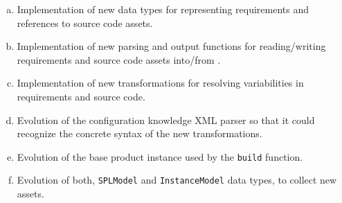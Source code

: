 \begin{enumerate}[(a)]

\item Implementation of new data types for representing requirements
  and references to source code assets.

\item Implementation of new parsing and output functions for
  reading/writing requirements and source code assets into/from \hp.

\item Implementation of new transformations for resolving
  variabilities in requirements and source code.

\item Evolution of the configuration knowledge XML parser so that it
  could recognize the concrete syntax of the new transformations.

\item Evolution of the base product instance used by the \texttt{build}
  function.

\item Evolution of both, \texttt{SPLModel} and \texttt{InstanceModel}
  data types, to collect new assets.

\end{enumerate}



